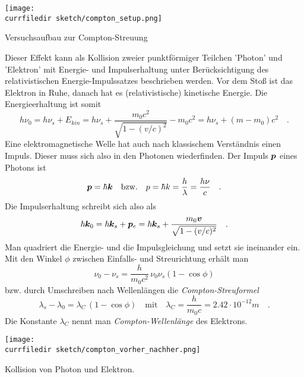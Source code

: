  \begin{marginfigure}
    \texttt{[image: \\currfiledir sketch/compton\_setup.png]}
    \caption{Versuchsaufbau zur Compton-Streuung}
\end{marginfigure}


 Dieser Effekt kann als Kollision zweier punktförmiger Teilchen 'Photon' und 'Elektron' mit Energie- und Impulserhaltung unter Berücksichtigung des relativistischen Energie-Impulssatzes beschrieben werden. Vor dem Stoß ist das Elektron in Ruhe, danach hat es (relativistische) kinetische Energie. Die Energieerhaltung ist somit
\begin{equation}
    h \nu_0 = h \nu_s + E_{kin} = h \nu_s + \frac{m_0 c^2}{\sqrt{1 - (v/c)^2}} - m_0 c^2 = h \nu_s + (m - m_0) c^2 \quad .
\end{equation}
Eine elektromagnetische Welle hat auch nach klassischem Verständnis einen Impuls. Dieser muss sich also in den Photonen wiederfinden. Der Impuls $\boldsymbol{p}$ eines Photons ist 
\begin{equation}
    \boldsymbol{p} = \hbar \boldsymbol{k} \quad \text{bzw.} \quad p = \hbar k = \frac{h}{\lambda} = \frac{h \nu}{c} \quad .
    \label{eq:2_impuls_photon}
\end{equation}
Die Impulserhaltung schreibt sich also als
\begin{equation}
    \hbar \boldsymbol{k}_0 = \hbar \boldsymbol{k}_s + \boldsymbol{p}_e = \hbar \boldsymbol{k}_s + \frac{m_0 \boldsymbol{v}}{\sqrt{1 - (v/c)^2}} \quad .
\end{equation}
Man quadriert die Energie- und die Impulsgleichung und setzt sie ineinander ein. Mit den Winkel $\phi$ zwischen Einfalls- und Streurichtung erhält man
\begin{equation}
    \nu_0 - \nu_s = \frac{h}{m_0 c^2} \, \nu_0 \nu_s (1 - \cos \phi)
\end{equation}
bzw. durch Umschreiben nach Wellenlängen die \emph{Compton-Streuformel}
\begin{equation}
    \lambda_s - \lambda_0 =  \lambda_C \, (1 - \cos \phi) \quad \text{mit} \quad
    \lambda_C = \frac{h}{m_0 c} = 2.42 \cdot 10^{-12} m \quad .
\end{equation}
Die Konstante $\lambda_C$ nennt man \emph{Compton-Wellenlänge} des Elektrons.


\begin{marginfigure}
    \texttt{[image: \\currfiledir sketch/compton\_vorher\_nachher.png]}
    \caption{Kollision von Photon und Elektron.}
\end{marginfigure}


